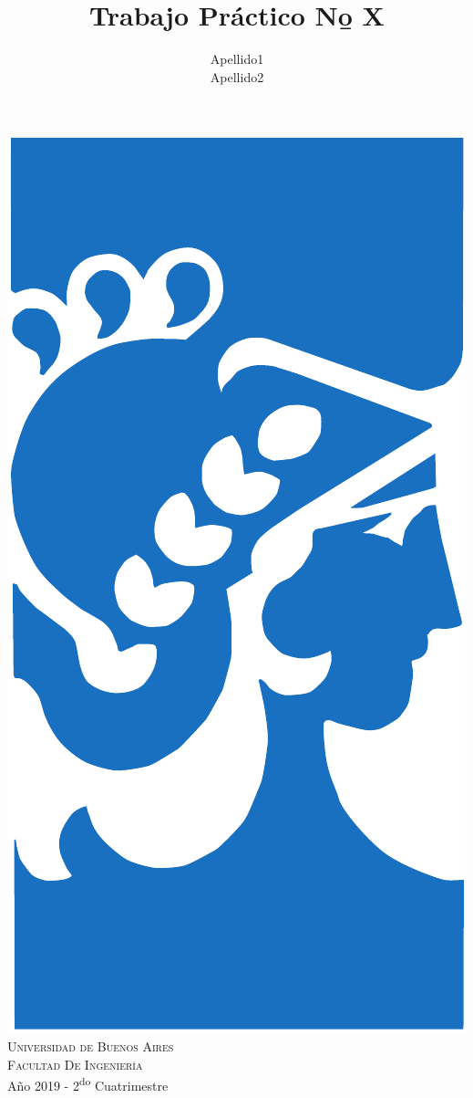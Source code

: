 \documentclass[12pt]{article}
\title{Trabajo Práctico N\b o X}
\author{Apellido1\\Apellido2}
\numberwithin{equation}{section}
\numberwithin{figure}{section}
\numberwithin{table}{section}
\begin{document}
%
%
\pagestyle{fancy}
\renewcommand{\sectionmark}[1]{\markboth{}{\thesection\ \ #1}}
\lhead{}
\chead{}
\rhead{\rightmark}
\lfoot{}
\cfoot{}
\rfoot{\thepage}

%
%
\begin{titlepage}

\thispagestyle{empty}

\begin{center}
\includegraphics[scale=0.3]{fiuba}\\
\large{\textsc{Universidad de Buenos Aires}}\\
\large{\textsc{Facultad De Ingeniería}}\\
\small{Año 2019 - 2\textsuperscript{do} Cuatrimestre}
\end{center}


\end{titlepage}
\end{document}
